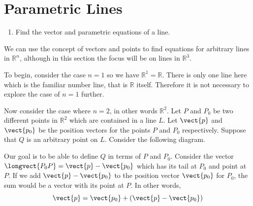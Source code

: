 \section{Parametric Lines}

\begin{outcome}

\begin{enumerate}

\item[A.] Find the vector and parametric equations of a line.

\end{enumerate}
\end{outcome}

We can use the concept of vectors and points to find equations for arbitrary lines in $\mathbb{R}^n$, although in this section the focus will be on lines in $\mathbb{R}^3$. 

To begin, consider the case $n=1$ so we have $\mathbb{R}^{1}=\mathbb{R}$. There is only one line here which is the familiar number line, that is $\mathbb{R}$ itself. Therefore it is not necessary to explore the case of $n=1$ further. 

Now consider the case where $n=2$, in other words $\mathbb{R}^2$.  Let $P $ and $P_0$ be
two different points in $\mathbb{R}^{2}$ which are contained in a line
$L$. Let $\vect{p}$ and $\vect{p_0}$ be the position vectors for the points $P$ and $P_0$
respectively. Suppose that $Q$ is an arbitrary point on $L$. Consider the following
diagram.

\begin{center}
\end{center}

Our goal is to be able to define $Q$ in terms of $P$  and $P_0$. Consider the vector $\longvect{P_0P} = \vect{p} - \vect{p_0}$ which
has its tail at $P_0$ and point at $P$. If we add $\vect{p} - \vect{p_0}$ to the position vector $\vect{p_0}$ for $P_0$,  
the sum would be a vector with its point at $P$. 
In other words,
\begin{equation*}
\vect{p} = \vect{p_0} + (\vect{p} - \vect{p_0})
\end{equation*}

